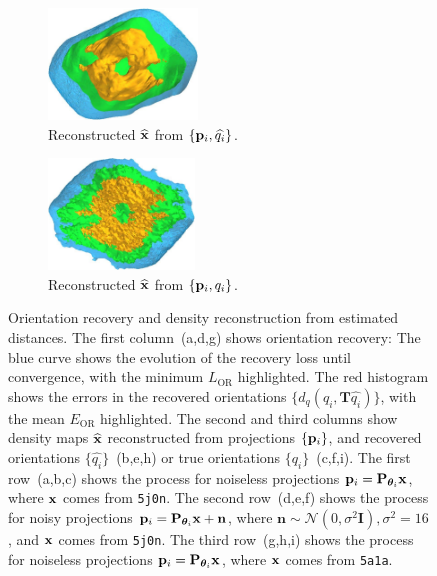 \begin{figure}[t]
\begin{subfigure}[b]{0.26\linewidth}
        \centering
        \includegraphics[height=8em]{figures/5a1a_aligned}
        \caption{Reconstructed $\widehat{\mathbf{x}}$ from $\{ \mathbf{p}_i, \widehat{q_i} \}$.}%
        \label{fig:5a1a-noise0-reconstruction-recovered}
    \end{subfigure}
    \hfill
    \begin{subfigure}[b]{0.26\linewidth}
        \centering
        \includegraphics[height=8em]{figures/5a1a_ground_truth}
        \caption{Reconstructed $\widehat{\mathbf{x}}$ from $\{ \mathbf{p}_i, q_i \}$.}%
        \label{fig:5a1a-noise0-reconstruction-true}
    \end{subfigure}
    \caption{%
        Orientation recovery and density reconstruction from estimated distances.
        The first column~(a,d,g) shows orientation recovery:
        The blue curve shows the evolution of the recovery loss until convergence, with the minimum $L_\text{OR}$  highlighted.
        The red histogram shows the errors in the recovered orientations $\{d_q(q_i, \mathbf{T}\widehat{q_i})\}$, with the mean $E_\text{OR}$  highlighted.
    The second and third columns show density maps $\widehat{\mathbf{x}}$ reconstructed from projections $\{ \mathbf{p}_i \}$, and recovered orientations $\{ \widehat{q_i} \}$~(b,e,h) or true orientations $\{ q_i \}$~(c,f,i).
        The first row~(a,b,c) shows the process for noiseless projections $\mathbf{p}_i = \mathbf{P}_{{\boldsymbol{\theta}}_i} \mathbf{x}$, where $\mathbf{x}$ comes from \texttt{5j0n}.
        The second row~(d,e,f) shows the process for noisy projections $\mathbf{p}_i = \mathbf{P}_{{\boldsymbol{\theta}}_i} \mathbf{x} + \mathbf{n}$, where $\mathbf{n} \sim \mathcal{N}(0, \sigma^2\mathbf{I}), \sigma^2=16$, and $\mathbf{x}$ comes from \texttt{5j0n}.
        The third row~(g,h,i) shows the process for noiseless projections $\mathbf{p}_i = \mathbf{P}_{{\boldsymbol{\theta}}_i} \mathbf{x}$, where $\mathbf{x}$ comes from \texttt{5a1a}.
    }
\end{figure}

